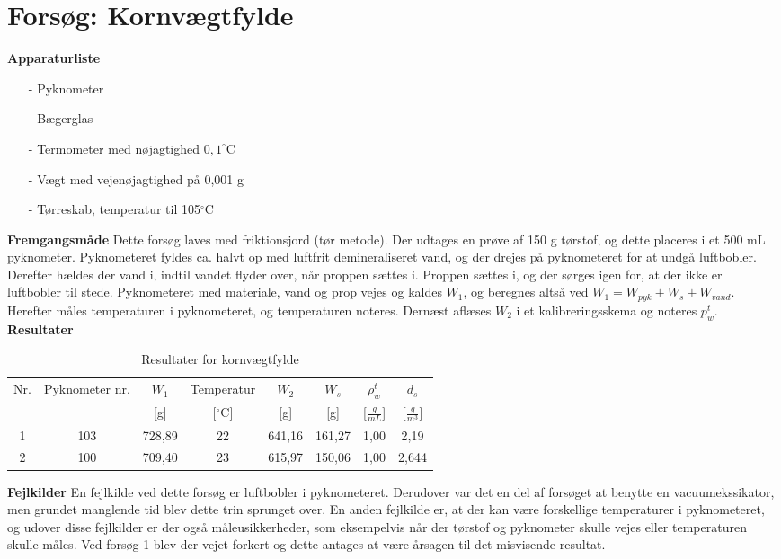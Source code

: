 \chapter{Forsøg: Kornvægtfylde}

\textbf{Apparaturliste}
\begin{itemize}
\item[-] Pyknometer
\item[-] Bægerglas
\item[-] Termometer med nøjagtighed $0,\!1^{\circ}$C
\item[-] Vægt med vejenøjagtighed på 0,001 g
\item[-] Tørreskab, temperatur til 105$^{\circ}$C
\end{itemize}

\textbf{Fremgangsmåde}
\newline
Dette forsøg laves med friktionsjord (tør metode). Der udtages en prøve af 150 g tørstof, og dette placeres i et 500 mL pyknometer. Pyknometeret fyldes ca. halvt op med luftfrit demineraliseret vand, og der drejes på pyknometeret for at undgå luftbobler. Derefter hældes der vand i, indtil vandet flyder over, når proppen sættes i. Proppen sættes i, og der sørges igen for, at der ikke er luftbobler til stede. Pyknometeret med materiale, vand og prop vejes og kaldes $W_{1}$, og beregnes altså ved $W_1 = W_{pyk} + W_s + W_{vand}$. Herefter måles temperaturen i pyknometeret, og temperaturen noteres. Dernæst aflæses $W_{2}$ i et kalibreringsskema og noteres $p_w^t$.
\newline
\newline
\textbf{Resultater}
\begin{table} [H]
\begin{center}
	\begin{tabular}{ c c c c c c c c } 
		\hline
		Nr. & Pyknometer nr. & $W_1$ & Temperatur & $W_2$ & $W_s$ & $\rho_{w}^t$ & $d_s$  \\
		&{\tiny } & [g] & [$^{\circ}$C] & [g] & [g] & [$\frac{g}{mL}$] & [$\frac{g}{m^3}$] \\ \hline
		1 & 103 & 728,89 & 22 & 641,16 & 161,27 & 1,00 & 2,19 \\
		2 & 100 & 709,40 & 23 & 615,97 & 150,06 & 1,00 & 2,644 \\
	\end{tabular}
	\caption{Resultater for kornvægtfylde}
	\label{tab:bilagc1}
\end{center}
\end{table}

\textbf{Fejlkilder}
\newline
En fejlkilde ved dette forsøg er luftbobler i pyknometeret. Derudover var det en del af forsøget at benytte en vacuumekssikator, men grundet manglende tid blev dette trin sprunget over. En anden fejlkilde er, at der kan være forskellige temperaturer i pyknometeret, og udover disse fejlkilder er der også måleusikkerheder, som eksempelvis når der tørstof og pyknometer skulle vejes eller temperaturen skulle måles. 
Ved forsøg 1 blev der vejet forkert og dette antages at være årsagen til det misvisende resultat.